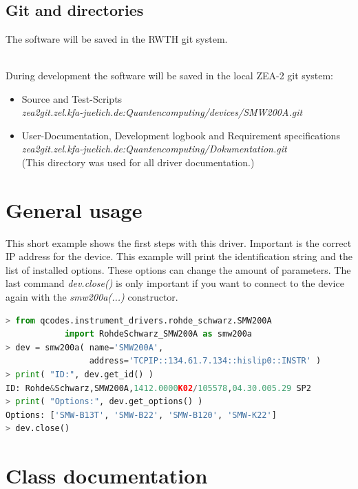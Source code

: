 \documentclass[11pt]{article} %
\begin{document}
\ \\

\subsection{Git and directories}

The software will be saved in the RWTH git system.

\ \\

During development the software will be saved in the local ZEA-2 git system:
\begin{itemize}
\item Source and Test-Scripts \\
	{\it zea2git.zel.kfa-juelich.de:Quantencomputing/devices/SMW200A.git}
\item User-Documentation, Development logbook and Requirement specifications \\
	{\it zea2git.zel.kfa-juelich.de:Quantencomputing/Dokumentation.git} \\
	{\small (This directory was used for all driver documentation.)}
\end{itemize}


\clearpage


\section{General usage}

This short example shows the first steps with this driver. Important is the correct IP address for the device. This example will print the identification string and the list of installed options. These options can change the amount of parameters. The last command {\it dev.close()} is only important if you want to connect to the device again with the {\it smw200a(...)} constructor.

\begin{lstlisting}[frame=single, language=Python]
> from qcodes.instrument_drivers.rohde_schwarz.SMW200A
			import RohdeSchwarz_SMW200A as smw200a
> dev = smw200a( name='SMW200A',
                 address='TCPIP::134.61.7.134::hislip0::INSTR' )
> print( "ID:", dev.get_id() )
ID: Rohde&Schwarz,SMW200A,1412.0000K02/105578,04.30.005.29 SP2
> print( "Options:", dev.get_options() )
Options: ['SMW-B13T', 'SMW-B22', 'SMW-B120', 'SMW-K22']
> dev.close()
\end{lstlisting}


\section{Class documentation}
\end{document}
